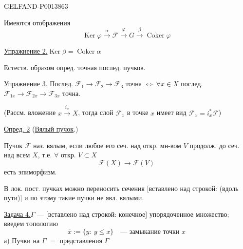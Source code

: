 \begin{GelfandAdjacentEvidence}{GELFAND-P001386}{3}



Имеются отображения
\[
\operatorname{Ker}\varphi\overset{\alpha}{\longrightarrow}\mathcal F
\overset{\varphi}{\longrightarrow}G
\overset{\beta}{\longrightarrow}\operatorname{Coker}\varphi
\]

\uline{Упражнение 2.}\quad \(\operatorname{Ker}\beta=\operatorname{Coker}\alpha\)

Естеств. образом опред. точная послед. пучков.

\uline{Упражнение 3.}\quad
Послед. \(\mathcal F_1\longrightarrow\mathcal F_2\longrightarrow\mathcal F_3\)
точна \(\Longleftrightarrow\ \forall x\in X\)
послед. \(\mathcal F_{1x}\longrightarrow\mathcal F_{2x}\longrightarrow\mathcal F_{3x}\)
точна.

(Рассм. вложение \(x\overset{i_x}{\longrightarrow}X\), тогда слой
\(\mathcal F_x\) в точке \(x\) имеет вид \(\mathcal F_x=i_x^*\mathcal F\))

\uline{Опред. 2} (\uline{Вялый пучок}.)

Пучок \(\mathcal F\) наз. вялым, если любое его сеч. над откр. мн-вом \(V\) продолж. до сеч. над всем \(X\),
т.е. \(\forall\) откр. \(V\subset X\)
\[
\mathcal F(X)\longrightarrow\mathcal F(V)
\]
есть эпиморфизм.

\end{GelfandAdjacentEvidence}


В лок. пост. пучках можно переносить сечения [вставлено над строкой: (вдоль пути)] и по этому такие пучки не явл. \uline{вялыми}.

\uline{Задача 4.}\quad \(\Gamma\) --- 
[вставлено над строкой: конечное] упорядоченное множество; введем топологию
\[
\overline{x}:=\{y:\ y\leq x\}\quad\text{--- замыкание точки }x
\]
а) Пучки на \(\Gamma\) \(=\) представления \(\Gamma\)

